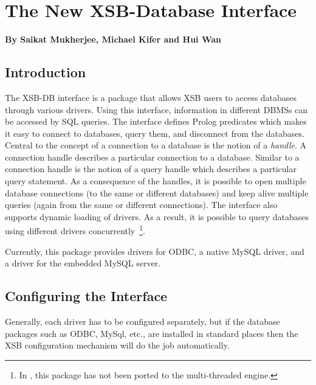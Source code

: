 
\chapter{The New XSB-Database Interface} \label{db_interface}

\begin{center}
{\Large {\bf By Saikat Mukherjee, Michael Kifer and Hui Wan }}
\end{center}

\section{Introduction}

The XSB-DB interface is a package that allows XSB users to access
databases through various drivers. Using this interface, information
in different DBMSs can be accessed by SQL queries. The interface
defines Prolog predicates which makes it easy to connect to databases,
query them, and disconnect from the databases. Central to the concept
of a connection to a database is the notion of a \emph{handle}.  A
connection handle describes a particular connection to a database.
Similar to a connection handle is the notion of a query handle which
describes a particular query statement. As a consequence of the
handles, it is possible to open multiple database connections (to the
same or different databases) and keep alive multiple queries (again
from the same or different connections). The interface also supports
dynamic loading of drivers. As a result, it is possible to query
databases using different drivers concurrently~\footnote{In
  \version{}, this package has not been ported to the multi-threaded
  engine.}.

Currently, this package provides drivers for ODBC, a native MySQL driver,
and a driver for the embedded MySQL server.

\section{Configuring the Interface}

Generally, each driver has to be configured separately, but if the database
packages such as ODBC, MySql, etc., are installed in standard places then
the XSB configuration mechanism will do the job automatically.

